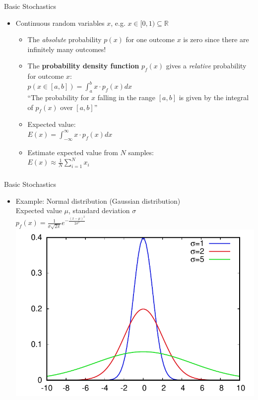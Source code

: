 \documentclass[utf8,stillsansserifmath,fleqn,t]{beamer}
\newcommand{\ds}{\displaystyle}
\begin{document}
\begin{frame}[label=basic-stochastics-2]
\frametitle{\insertsection}
Basic Stochastics
\begin{itemize}
\item Continuous random variables $x$, e.g.  $\displaystyle x \in [0,1) \subseteq \mathbb{R}$
\begin{itemize}
\item The \emph{absolute} probability $p(x)$ for one outcome $x$ is zero since there are infinitely many outcomes!
\item The \textbf{probability density function} $p_f(x)$ gives a \emph{relative} probability for outcome $x$:\\
$\ds p(x \in [a,b]) = \int_{a}^b x\cdot p_f(x)dx$\\
``The probability for $x$ falling in the range $[a,b]$ is given by the integral of $p_f(x)$ over $[a,b]$''
\item Expected value:\\
    $\displaystyle E(x) = \int_{-\infty}^\infty x\cdot p_f(x) dx$
\item Estimate expected value from $N$ samples:\\
    $\displaystyle E(x) \approx \frac{1}{N}\sum_{i=1}^{N}x_i$
\end{itemize}
\end{itemize}
\end{frame}

\begin{frame}
\frametitle{\insertsection}
Basic Stochastics
\begin{itemize}
\item Example: Normal distribution (Gaussian distribution)\\
Expected value $\mu$, standard deviation $\sigma$\\
$\displaystyle p_f(x) = \frac{1}{\sigma\sqrt{2\pi}} e^{-\frac{(x-\mu)^2}{2\sigma^2}}$\\
\includegraphics[width=.6\textwidth]{./fig/gaussian-distribution.pdf}
\end{itemize}
\end{frame}
\end{document}

